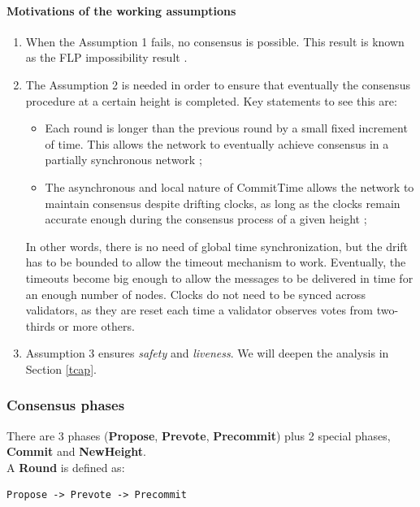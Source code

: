 \documentclass[]{article}
\begin{document}
\paragraph{Motivations of the working assumptions}
\begin{enumerate}
	\item When the Assumption 1 fails, no consensus is possible. This result is known as the FLP impossibility result \cite{flp}. 
	
	\item The Assumption 2 is needed in order to ensure that eventually the consensus procedure at a certain height is completed. Key statements to see this are:
	
	\begin{itemize}
		\item Each round is longer than the previous round by a small fixed increment of time. This allows the network to eventually achieve consensus in a partially synchronous network \cite[Section 6.2]{tpaper};
		\item The asynchronous and local nature of CommitTime allows the network to maintain consensus despite drifting clocks, as long as the clocks remain accurate enough during the consensus process of a given height \cite[Section 6.2]{tpaper};
	\end{itemize} 
	
	
	In other words, there is no need of global time synchronization, but the drift has to be bounded to allow the timeout mechanism to work. Eventually, the timeouts become big enough to allow the messages to be delivered in time for an enough number of nodes. Clocks do not need to be synced across validators, as they are reset each time a validator observes votes from two-thirds or more others.
	
	
	\item Assumption 3 ensures \textit{safety} and \textit{liveness}. We will deepen the analysis in Section \ref{tcap}.
\end{enumerate}

\subsubsection{Consensus phases}
There are 3 phases (\textbf{Propose}, \textbf{Prevote}, \textbf{Precommit}) plus 2 special phases, \textbf{Commit} and \textbf{NewHeight}.\\
A \textbf{Round} is defined as:

\begin{verbatim}
Propose -> Prevote -> Precommit
\end{verbatim}
\end{document}
